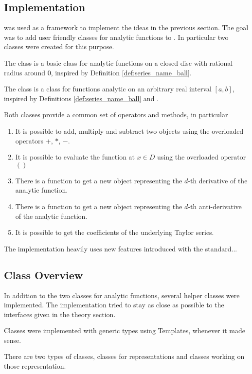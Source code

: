 	\subsection{Implementation}
		\irram was used as a framework to implement the ideas in the previous section.
		The goal was to add user friendly classes for analytic functions to \irram.
		In particular two classes were created for this purpose.

		The class \baana is a basic class for analytic functions on 
		a closed disc with rational radius around $0$, inspired by Definition \ref{def:series_name_ball}.

		The class \anarect is a class for functions analytic on an arbitrary real interval $[a,b]$, 
		inspired by Definitions \ref{def:series_name_ball} and \label{def:series_name_rect}.

		Both classes provide a common set of operators and methods, in particular
		\begin{enumerate}
			\item It is possible to add, multiply and subtract two objects using the overloaded operators $+$, $*$, $-$.
			\item It is possible to evaluate the function at $x \in D$ using the overloaded operator $()$
			\item There is a function  to get a new object representing the $d$-th derivative of the analytic function.
			\item There is a function  to get a new object representing the $d$-th anti-derivative of the analytic function.
			\item It is possible to get the coefficients of the underlying Taylor series.
		\end{enumerate}

		The implementation heavily uses new features introduced with the \ccx standard...

	\subsection{Class Overview}
		In addition to the two classes for analytic functions, several helper classes were implemented.
		The implementation tried to stay as close as possible to the interfaces given in the theory section.

		Classes were implemented with generic types using Templates, whenever it made sense.

 		There are two types of classes, classes for representations and classes working on those representation.

